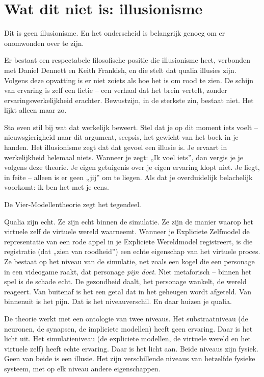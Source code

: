 \documentclass[11pt, twoside, openright]{book}
\begin{document}
\section*{Wat dit niet is: illusionisme}

Dit is geen illusionisme. En het onderscheid is belangrijk genoeg om er onomwonden over te zijn.

Er bestaat een respectabele filosofische positie die illusionisme heet, verbonden met Daniel Dennett en Keith Frankish, en die stelt dat qualia illusies zijn. Volgens deze opvatting is er niet zoiets als hoe het is om rood te zien. De schijn van ervaring is zelf een fictie -- een verhaal dat het brein vertelt, zonder ervaringswerkelijkheid erachter. Bewustzijn, in de sterkste zin, bestaat niet. Het lijkt alleen maar zo.

Sta even stil bij wat dat werkelijk beweert. Stel dat je op dit moment iets voelt -- nieuwsgierigheid naar dit argument, scepsis, het gewicht van het boek in je handen. Het illusionisme zegt dat dat gevoel een illusie is. Je ervaart in werkelijkheid helemaal niets. Wanneer je zegt: „Ik voel iets”, dan vergis je je volgens deze theorie. Je eigen getuigenis over je eigen ervaring klopt niet. Je liegt, in feite -- alleen is er geen „jij” om te liegen. Als dat je overduidelijk belachelijk voorkomt: ik ben het met je eens.

De Vier-Modellentheorie zegt het tegendeel.

Qualia zijn echt. Ze zijn echt binnen de simulatie. Ze zijn de manier waarop het virtuele zelf de virtuele wereld waarneemt. Wanneer je Expliciete Zelfmodel de representatie van een rode appel in je Expliciete Wereldmodel registreert, is die registratie (dat „zien van roodheid”) een echte eigenschap van het virtuele proces. Ze bestaat op het niveau van de simulatie, net zoals een kogel die een personage in een videogame raakt, dat personage \textit{pijn doet}. Niet metaforisch -- binnen het spel is de schade echt. De gezondheid daalt, het personage wankelt, de wereld reageert. Van buitenaf is het een getal dat in het geheugen wordt afgeteld. Van binnenuit is het pijn. Dat is het niveauverschil. En daar huizen je qualia.

De theorie werkt met een ontologie van twee niveaus. Het substraatniveau (de neuronen, de synapsen, de impliciete modellen) heeft geen ervaring. Daar is het licht uit. Het simulatieniveau (de expliciete modellen, de virtuele wereld en het virtuele zelf) heeft echte ervaring. Daar is het licht aan. Beide niveaus zijn fysiek. Geen van beide is een illusie. Het zijn verschillende niveaus van hetzelfde fysieke systeem, met op elk niveau andere eigenschappen.
\end{document}
